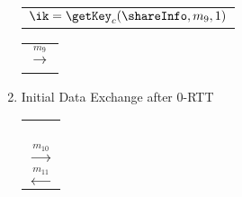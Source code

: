 \begin{figure*}[!h]
\begin{center}
\begin{enumerate}
{\begin{minipage}[t]{0.38\textwidth}
\begin{tabular}{c}
    $\ik = \getKey_c(\shareInfo, m_9, 1)$ \\
   \end{tabular}
  \end{minipage}%
 }
 \begin{minipage}[t]{0.13\textwidth}
  \centering
  \begin{tabular}{c}
   $\xrightarrow{m_9}$ \\
   $ $ \\
  \end{tabular}
 \end{minipage}%
 \item{Initial Data Exchange after 0-RTT} \\
 \begin{minipage}[t]{0.13\textwidth}
  \centering
  \begin{tabular}{c}
   $ $ \\
   $ $ \\
   $ $ \\
   $ $ \\
   $\xrightarrow{m_{10}}$ \\
   $\xleftarrow{m_{11}}$ \\
  \end{tabular}

\end{minipage}
\end{enumerate}
\end{center}
\end{figure*}
